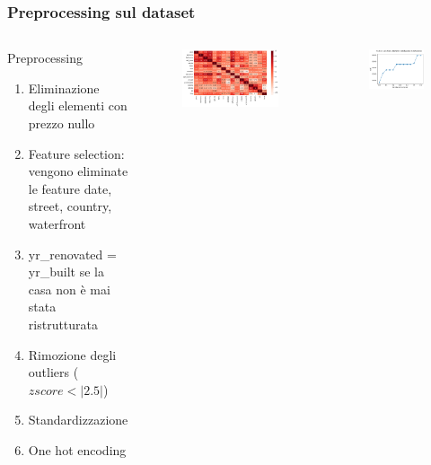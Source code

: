 \documentclass{beamer}
\begin{document}
\begin{frame}
	\frametitle{Preprocessing sul dataset}
	\begin{columns}
	\begin{block}{Preprocessing}
		\begin{enumerate}
			\item Eliminazione degli elementi con prezzo nullo
			\item Feature selection: vengono eliminate le feature \alert{date},
				\alert{street}, \alert{country}, \alert{waterfront}
			\item \alert{yr\_renovated = yr\_built} se la casa non è mai stata
				ristrutturata
			\item Rimozione degli outliers ($zscore < |2.5|$)
			\item Standardizzazione
			\item One hot encoding
		\end{enumerate}
	\end{block}
			\begin{figure}[ht]
				\centering
				\includegraphics[scale=0.2]{correlazione.png}
			\end{figure}
			\begin{figure}[ht]
				\centering
				\includegraphics[scale=0.3]{selection.png}
			\end{figure}
	\end{columns}
\end{frame}
\end{document}
